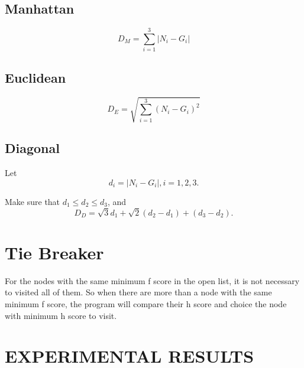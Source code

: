 \documentclass[conference]{IEEEtran}
\begin{document}
\subsection{Manhattan}

\begin{equation}
D_{M}=\sum_{i=1}^{3}{|N_i-G_i|}  \label{H1}
\end{equation}


\subsection{Euclidean}

\begin{equation}
D_{E}=\sqrt{\sum_{i=1}^{3}{(N_i-G_i)^2}} \label{H2}
\end{equation}

\subsection{Diagonal}
Let
\begin{equation*}
d_i=|N_i-G_i|, i=1,2,3.
\end{equation*}

Make sure that $ d_1 \leq d_2 \leq d_3 $, and
\begin{equation}
D_{D}=\sqrt{3}d_1+\sqrt{2}(d_2-d_1)+(d_3-d_2).   \label{H3}
\end{equation}

\section{Tie Breaker}
For the nodes with the same minimum f score in the open list, it is not necessary to visited all of them. So when there are more than a node with the same minimum f score, the program will compare their h score and choice the node with minimum h score to visit.


\section{EXPERIMENTAL RESULTS}
\end{document}

